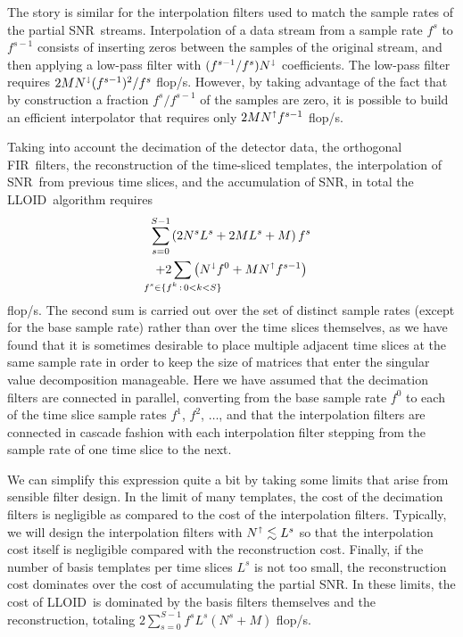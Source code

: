 \documentclass[preprint2]{aastex}
\newcommand{\SNR}{SNR}%
\newcommand{\numtmps}{\ensuremath{M}}
\newcommand{\svdtmps}[1]{\ensuremath{L^#1}}
\newcommand{\numsvdtmps}{\svdtmps{s}}
\newcommand{\slicesamps}[1]{\ensuremath{N^#1}}
\newcommand{\slicessamps}{\slicesamps{s}}
\newcommand{\fir}{FIR}%
\newcommand{\flops}{flop/s}
\newcommand{\lloid}{LLOID}%
\def\clap#1{\hbox to 0pt{\hss#1\hss}}
\def\mathclap{\mathpalette\mathclapinternal}
\def\mathclapinternal#1#2{\clap{$\mathsurround=0pt#1{#2}$}}
\begin{document}
The story is similar for the interpolation filters used to match the sample
rates of the partial \SNR\ streams.  Interpolation of a data stream from a
sample rate $f^s$ to $f^{s-1}$ consists of inserting zeros between the samples
of the original stream, and then applying a low-pass filter with
$(f^{s-1} / f^s) N^\shortdownarrow$ coefficients.  The low-pass filter requires
$2 M N^\shortdownarrow (f^{s-1})^2 / f^s$ \flops.  However, by taking advantage
of the fact that by construction a fraction $f^s / f^{s-1}$ of the samples are
zero, it is possible to build an efficient interpolator that requires only
$2 M N^\shortuparrow f^{s-1}$ \flops.

Taking into account the decimation of the detector data, the orthogonal \fir\
filters, the reconstruction of the time-sliced templates, the interpolation of
\SNR\ from previous time slices, and the accumulation of \SNR, in total the
\lloid\ algorithm requires
%
\begin{multline}
\label{eq:lloid-flops}
\sum_{\mathclap{s=0}}^{\mathclap{S-1}} \left( 2 \slicessamps \numsvdtmps + 2 \numtmps \numsvdtmps + \numtmps \right) f^s \\ + 2\sum_{\mathclap{f^s \in \{f^k \, : \, 0 < k < S\}}} \left( N^\shortdownarrow f^0 + \numtmps N^\shortuparrow f^{s-1}\right)
\end{multline}
%
\flops.  The second sum is carried out over the set of distinct sample rates
(except for the base sample rate) rather than over the time slices themselves,
as we have found that it is sometimes desirable to place multiple adjacent time
slices at the same sample rate in order to keep the size of matrices that enter
the singular value decomposition manageable.  Here we have assumed that the
decimation filters are connected in parallel, converting from the base sample
rate $f^0$ to each of the time slice sample rates $f^1$, $f^2$, $\dots$, and
that the interpolation filters are connected in cascade fashion with each
interpolation filter stepping from the sample rate of one time slice to the
next.

We can simplify this expression quite a bit by taking some limits that arise
from sensible filter design.  In the limit of many templates, the cost of the
decimation filters is negligible as compared to the cost of the interpolation
filters.  Typically, we will design the interpolation filters with
$N^\shortuparrow \lesssim \numsvdtmps$ so that the interpolation cost itself is
negligible compared with the reconstruction cost.  Finally, if the number of
basis templates per time slices $\numsvdtmps$ is not too small, the
reconstruction cost dominates over the cost of accumulating the partial \SNR.
In these limits, the cost of \lloid\ is dominated by the basis filters
themselves and the reconstruction, totaling
$2 \sum_{s=0}^{S-1} f^s \numsvdtmps \left( \slicessamps + \numtmps \right)$ \flops.
\end{document}
